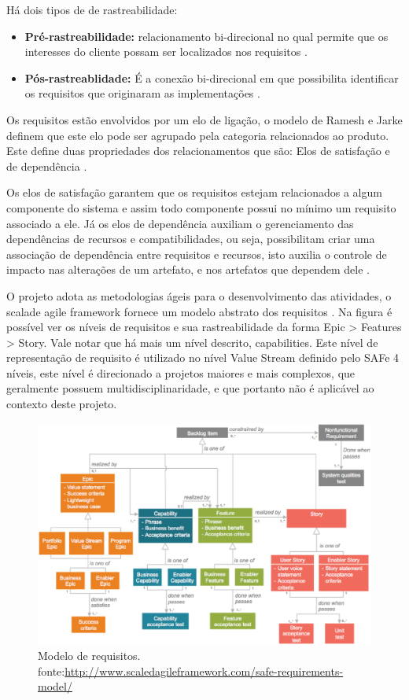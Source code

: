 Há dois tipos de de rastreabilidade:
\begin{itemize}
    \item \textbf{Pré-rastreabilidade:} relacionamento bi-direcional no qual permite que os interesses do cliente possam ser localizados nos requisitos \cite{silva2011}.
    \item \textbf{Pós-rastreablidade:} É a conexão bi-direcional em que possibilita identificar os requisitos que originaram as implementações \cite{silva2011}.
\end{itemize}

Os requisitos estão envolvidos por um elo de ligação, o modelo de Ramesh e Jarke definem que este elo pode ser agrupado pela categoria relacionados ao produto. Este define duas propriedades dos relacionamentos que são: Elos de satisfação e de dependência \cite{leite2005}.

Os elos de satisfação garantem que os requisitos estejam relacionados a algum componente do sistema e assim todo componente possui no mínimo um requisito associado a ele. Já os elos de dependência auxiliam o gerenciamento das dependências de recursos e compatibilidades, ou seja, possibilitam criar uma associação de dependência entre requisitos e recursos, isto auxilia o controle de impacto nas alterações de um artefato, e nos artefatos que dependem dele \cite{leite2005}.

O projeto adota as metodologias ágeis para o desenvolvimento das atividades, o scalade agile framework fornece um modelo abstrato dos requisitos \cite{safe}. Na figura é possível ver os níveis de requisitos e sua rastreabilidade da forma Epic > Features > Story. Vale notar que há mais um nível descrito, capabilities. Este nível de representação de requisito é utilizado no nível Value Stream definido pelo SAFe 4 níveis, este nível é direcionado a projetos maiores e mais complexos, que geralmente possuem multidisciplinaridade, e que portanto não é aplicável ao contexto deste projeto.

\begin{figure}[H]
    \centering
    \caption{Modelo de requisitos. fonte:\url{http://www.scaledagileframework.com/safe-requirements-model/}}
    \label{modeloRequisitos}
    \includegraphics[keepaspectratio=true,scale=0.5]{figuras/modeloRequisitos.eps}
\end{figure}


